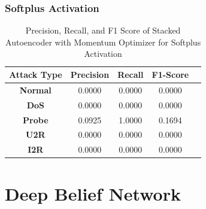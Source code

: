 \documentclass[12pt, a4paper]{report}
\begin{document}
\subsubsection{Softplus Activation}
\begin{table}[ht]
\centering
\captionsetup{justification=centering,margin=2cm}
\begin{tabular}{|c|c|c|c|c|}
\hline
\multicolumn{1}{|c|}{\textbf{Attack Type}} & \multicolumn{1}{c|}{\textbf{Precision}} & \multicolumn{1}{c|}{\textbf{Recall}} & \multicolumn{1}{c|}{\textbf{F1-Score}} \\ \hline
\textbf{Normal}        & 0.0000                                   & 0.0000                                & 0.0000                                                                  \\ \hline
\textbf{DoS}           & 0.0000                                  & 0.0000                                &  0.0000                                                                    \\ \hline
\textbf{Probe}         & 0.0925                                  & 1.0000                                & 0.1694                                                                  \\ \hline
\textbf{U2R}           & 0.0000                                    & 0.0000                                & 0.0000                                                                   \\ \hline
\textbf{I2R}           & 0.0000                                      & 0.0000                                   & 0.0000                                                            \\ \hline         \end{tabular}
\caption{Precision, Recall, and F1 Score of Stacked Autoencoder with Momentum Optimizer for Softplus Activation}
\label{prf1_mom_elu_auto}
\end{table}











\clearpage


\section{Deep Belief Network}\label{sec:dbn_eval}
\end{document}
